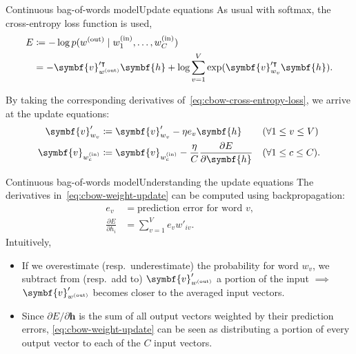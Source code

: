\documentclass[serif, xcolor={svgnames, table}, usepdftitle=false]{beamer}
\renewcommand*{\vec}{\symbf}
\begin{document}
\begin{frame}{Continuous bag-of-words model}{Update equations}
  As usual with softmax, the cross-entropy loss function is used,
  \begin{equation}\label{eq:cbow-cross-entropy-loss}
    \begin{aligned}
      E &\coloneqq -\log p(\wo \mid \wi_1, \ldots, \wi_C) \\
      &= -\vec{v}_{\wo}^{\prime\intercal} \vec{h} + \log \sum\limits_{v = 1}^{V}
      \exp(\vec{v}_{w_v}^{\prime\intercal} \vec{h})\text{.}
    \end{aligned}
  \end{equation}

  By taking the corresponding derivatives of~\eqref{eq:cbow-cross-entropy-loss},
  we arrive at the update equations:
  \begin{equation}\label{eq:cbow-weight-update}
    \begin{aligned}
      \vec{v}'_{w_v}&\coloneqq \vec{v}'_{w_v} - \eta e_v \vec{h} && (\forall 1 \le v \le V) \\
      \vec{v}_{\wi_c} &\coloneqq \vec{v}_{\wi_c} - \frac{\eta}{C} \frac{\partial
        E}{\partial \vec{h}} && (\forall 1 \le c \le C)\text{.}
    \end{aligned}
  \end{equation}
\end{frame}

\begin{frame}{Continuous bag-of-words model}{Understanding the update equations}
  The derivatives in~\eqref{eq:cbow-weight-update} can be computed using
  backpropagation:
  \begin{align*}
    e_v &= \text{prediction error for word }v\text{,} \\
    \frac{\partial E}{\partial h_i} &= \sum\limits_{v = 1}^{V} e_v w'_{i v}\text{.}
  \end{align*}
  Intuitively,
  \begin{itemize}
  \item If we overestimate (resp.\ underestimate) the probability for word
    \(w_v\), we subtract from (resp.\ add to) \(\vec{v}'_{\wo}\) a portion of
    the input \(\implies\) \(\vec{v}'_{\wo}\) becomes closer to the averaged
    input vectors.
  \item Since \(\partial E / {\partial \vec{h}}\) is the sum of all output
    vectors weighted by their prediction errors, \eqref{eq:cbow-weight-update}
    can be seen as distributing a portion of every output vector to each of the
    \(C\) input vectors.
  \end{itemize}
\end{frame}
\end{document}
